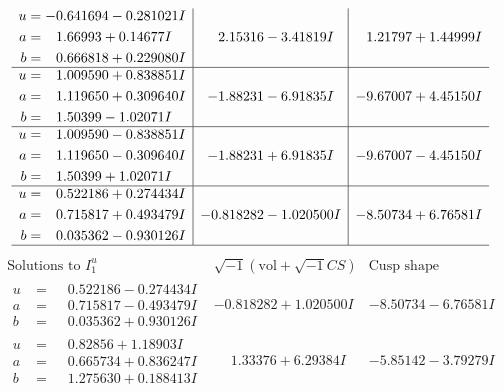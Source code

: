 \documentclass[1p]{elsarticle_modified}
\theoremstyle{definition}
\newcommand{\I}{\sqrt{-1}}
\begin{document}
$$\begin{array}{c|c|c}
\begin{aligned}
u &= -0.641694 - 0.281021 I \\
a &= \phantom{-}1.66993 + 0.14677 I \\
b &= \phantom{-}0.666818 + 0.229080 I\end{aligned}
 & \phantom{-}2.15316 - 3.41819 I & \phantom{-}1.21797 + 1.44999 I \\ \hline\begin{aligned}
u &= \phantom{-}1.009590 + 0.838851 I \\
a &= \phantom{-}1.119650 + 0.309640 I \\
b &= \phantom{-}1.50399 - 1.02071 I\end{aligned}
 & -1.88231 - 6.91835 I & -9.67007 + 4.45150 I \\ \hline\begin{aligned}
u &= \phantom{-}1.009590 - 0.838851 I \\
a &= \phantom{-}1.119650 - 0.309640 I \\
b &= \phantom{-}1.50399 + 1.02071 I\end{aligned}
 & -1.88231 + 6.91835 I & -9.67007 - 4.45150 I \\ \hline\begin{aligned}
u &= \phantom{-}0.522186 + 0.274434 I \\
a &= \phantom{-}0.715817 + 0.493479 I \\
b &= \phantom{-}0.035362 - 0.930126 I\end{aligned}
 & -0.818282 - 1.020500 I & -8.50734 + 6.76581 I\\
 \hline 
 \end{array}$$\newpage$$\begin{array}{c|c|c}  
\text{Solutions to }I^u_{1}& \I (\text{vol} + \sqrt{-1}CS) & \text{Cusp shape}\\
 \hline 
\begin{aligned}
u &= \phantom{-}0.522186 - 0.274434 I \\
a &= \phantom{-}0.715817 - 0.493479 I \\
b &= \phantom{-}0.035362 + 0.930126 I\end{aligned}
 & -0.818282 + 1.020500 I & -8.50734 - 6.76581 I \\ \hline\begin{aligned}
u &= \phantom{-}0.82856 + 1.18903 I \\
a &= \phantom{-}0.665734 + 0.836247 I \\
b &= \phantom{-}1.275630 + 0.188413 I\end{aligned}
 & \phantom{-}1.33376 + 6.29384 I & -5.85142 - 3.79279 I \\ \hline\begin{aligned}

\end{aligned}
\end{array}$$
\end{document}
